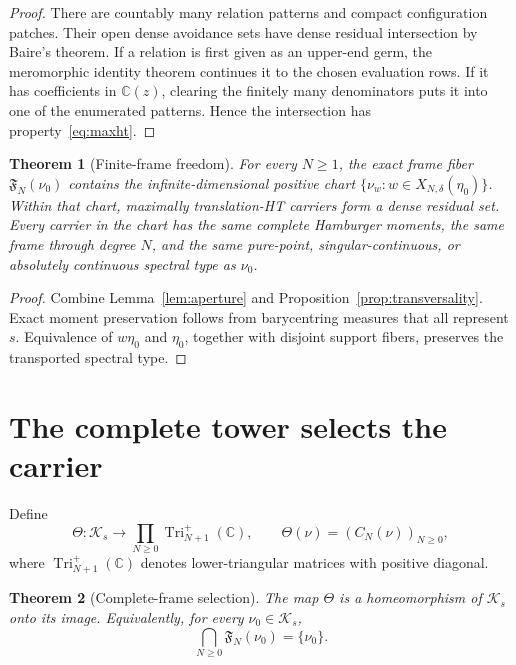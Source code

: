 \documentclass[11pt]{article}
\newtheorem{theorem}{Theorem}[section]
\newcommand{\C}{\mathbb C}
\newcommand{\cK}{\mathcal K}
\begin{document}
\begin{proof}
There are countably many relation patterns and compact configuration patches.  Their open dense
avoidance sets have dense residual intersection by Baire's theorem.  If a relation is first given
as an upper-end germ, the meromorphic identity theorem continues it to the chosen evaluation
rows.  If it has coefficients in $\C(z)$, clearing the finitely many denominators puts it into one
of the enumerated patterns.  Hence the intersection has property~\eqref{eq:maxht}.
\end{proof}

\begin{theorem}[Finite-frame freedom]\label{thm:finite-frame}
For every $N\geq1$, the exact frame fiber $\mathfrak F_N(\nu_0)$ contains the
infinite-dimensional positive chart
$\{\nu_w:w\in X_{N,\delta}(\eta_0)\}$.  Within that chart, maximally translation-HT carriers form
a dense residual set.  Every carrier in the chart has the same complete Hamburger moments, the
same frame through degree $N$, and the same pure-point, singular-continuous, or absolutely
continuous spectral type as $\nu_0$.
\end{theorem}

\begin{proof}
Combine Lemma~\ref{lem:aperture} and Proposition~\ref{prop:transversality}.  Exact moment
preservation follows from barycentring measures that all represent $s$.  Equivalence of
$w\eta_0$ and $\eta_0$, together with disjoint support fibers, preserves the transported spectral
type.
\end{proof}

\section{The complete tower selects the carrier}\label{sec:selection}

Define
\begin{equation}\label{eq:theta}
  \Theta:\cK_s\longrightarrow\prod_{N\geq0}\operatorname{Tri}_{N+1}^{+}(\C),
  \qquad \Theta(\nu)=(C_N(\nu))_{N\geq0},
\end{equation}
where $\operatorname{Tri}_{N+1}^{+}(\C)$ denotes lower-triangular matrices with positive diagonal.

\begin{theorem}[Complete-frame selection]\label{thm:selection}
The map $\Theta$ is a homeomorphism of $\cK_s$ onto its image.  Equivalently, for every
$\nu_0\in\cK_s$,
\begin{equation}\label{eq:intersection}
  \bigcap_{N\geq0}\mathfrak F_N(\nu_0)=\{\nu_0\}.
\end{equation}
\end{theorem}
\end{document}
